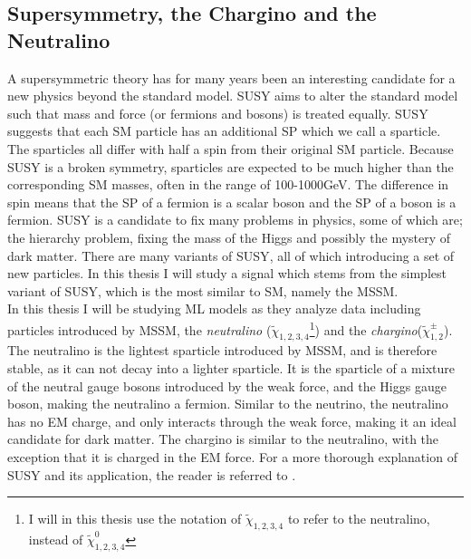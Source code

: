 \subsection{Supersymmetry, the Chargino and the Neutralino}\label{subsec:SS}
A supersymmetric theory has for many years been an interesting candidate for a new physics beyond the standard 
model. \ac{SUSY} aims to alter the standard model such that mass and force (or fermions and bosons) is treated equally. 
\ac{SUSY} suggests that each \ac{SM} particle has an additional \ac{SP} which we call a sparticle. 
The sparticles all differ with half a spin from their original \ac{SM} particle. Because \ac{SUSY} is a broken symmetry, 
sparticles are expected to be much higher than the corresponding \ac{SM} masses, often in the range of 100-1000GeV. 
The difference in spin means that the \ac{SP} of a fermion is a scalar boson and the \ac{SP} of a boson is a fermion. \ac{SUSY} is a 
candidate to fix many problems in physics, some of which are; the hierarchy problem, fixing the mass of the Higgs 
and possibly the mystery of dark matter. There are many variants of \ac{SUSY}, all of which introducing a set of new 
particles. In this thesis I will study a signal which stems from the simplest variant of \ac{SUSY}, which is the most 
similar to \ac{SM}, namely the \ac{MSSM}. 
\\
In this thesis I will be studying \ac{ML} models as they analyze data including particles introduced by \ac{MSSM}, the \emph{neutralino} ($\tilde{\chi}_{1,2,3,4}$\footnote{I will in this thesis 
use the notation of $\tilde{\chi}_{1,2,3,4}$ to refer to the neutralino, instead of $\tilde{\chi}^0_{1,2,3,4}$}) and 
the \emph{chargino}($\tilde{\chi}^{\pm}_{1,2}$). The neutralino is the lightest sparticle introduced by \ac{MSSM}, and is therefore stable, as it can not decay into a lighter sparticle. 
It is the sparticle of a mixture of the neutral gauge bosons introduced by the weak force, and the Higgs gauge boson, making the neutralino a 
fermion. Similar to the neutrino, the neutralino has no \ac{EM} charge, and only interacts through the weak force, making it an ideal candidate 
for dark matter. The chargino is similar to the neutralino, with the exception that it is charged in the \ac{EM} force. 
For a more thorough explanation of \ac{SUSY} and its application, the reader is referred to \cite{SUSY}. 